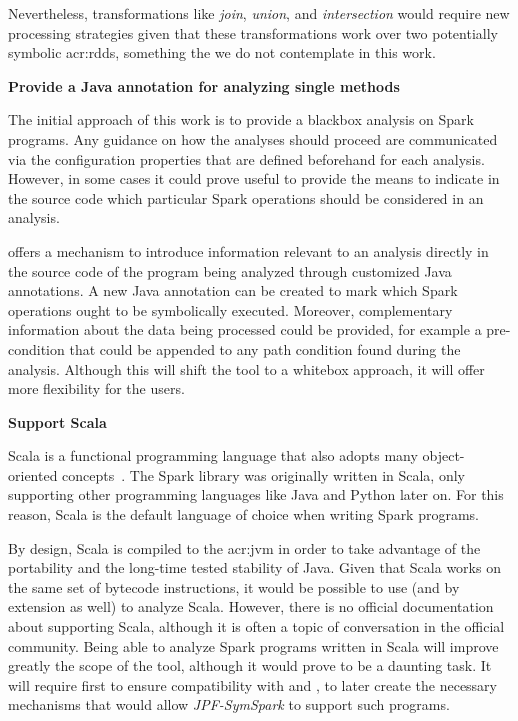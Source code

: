 Nevertheless, transformations like \textit{join}, \textit{union}, and \textit{intersection} would require new processing strategies given that these transformations work over two potentially symbolic \acrshort{acr:rdd}s, something the we do not contemplate in this work.

\textbf{Provide a Java annotation for analyzing single methods}

The initial approach of this work is to provide a blackbox analysis on Spark programs. Any guidance on how the analyses should proceed are communicated via the configuration properties that are defined beforehand for each analysis. However, in some cases it could prove useful to provide the means to indicate in the source code which particular Spark operations should be considered in an analysis.

\jpf{} offers a mechanism to introduce information relevant to an analysis directly in the source code of the program being analyzed through customized Java annotations. A new Java annotation can be created to mark which Spark operations ought to be symbolically executed. Moreover, complementary information about the data being processed could be provided, for example a pre-condition that could be appended to any path condition found during the analysis. Although this will shift the tool to a whitebox approach, it will offer more flexibility for the users. 

\textbf{Support Scala}

Scala is a functional programming language that also adopts many object-oriented concepts~\cite{WebScala2017}. The Spark library was originally written in Scala, only supporting other programming languages like Java and Python later on. For this reason, Scala is the default language of choice when writing Spark programs. 

By design, Scala is compiled to the \acrlong{acr:jvm} in order to take advantage of the portability and the long-time tested stability of Java. Given that Scala works on the same set of bytecode instructions, it would be possible to use \jpf{} (and by extension \spf{} as well) to analyze Scala. However, there is no official documentation about \jpf{} supporting Scala, although it is often a topic of conversation in the official \jpf{} community. Being able to analyze Spark programs written in Scala will improve greatly the scope of the tool, although it would prove to be a daunting task. It will require first to ensure compatibility with \jpf{} and \spf{}, to later create the necessary mechanisms that would allow \textit{JPF-SymSpark} to support such programs.
